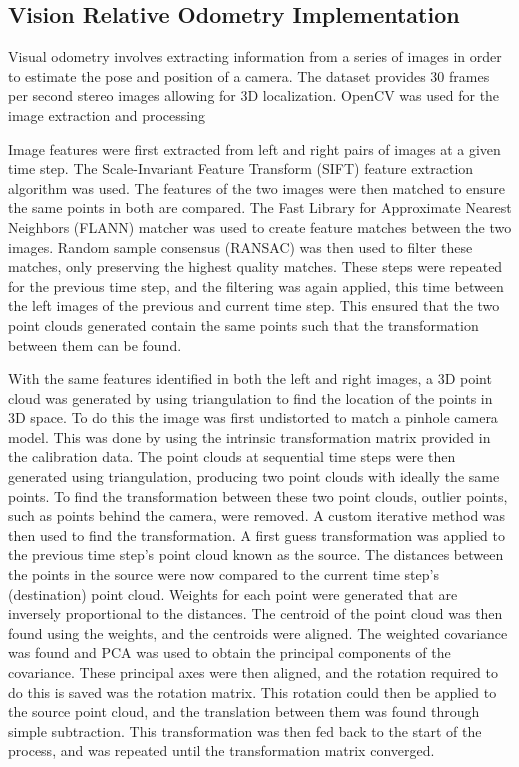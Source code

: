 \documentclass[bare_jrnl_transmag]{subfiles}
\begin{document}
\subsection{Vision Relative Odometry Implementation}

Visual odometry involves extracting information from a series of images in order to estimate the pose and position of a camera. The dataset provides 30 frames per second stereo images allowing for 3D localization. OpenCV was used for the image extraction and processing \cite{opencv} \newline 

Image features were first extracted from left and right pairs of images at a given time step. The Scale-Invariant Feature Transform (SIFT) feature extraction algorithm was used. The features of the two images were then matched to ensure the same points in both are compared. The Fast Library for Approximate Nearest Neighbors (FLANN) matcher was used to create feature matches between the two images.  Random sample consensus (RANSAC) was then used to filter these matches, only preserving the highest quality matches.  These steps were repeated for the previous time step, and the filtering was again applied, this time between the left images of the previous and current time step. This ensured that the two point clouds generated contain the same points such that the transformation between them can be found. \newline

With the same features identified in both the left and right images, a 3D point cloud was generated by using triangulation to find the location of the points in 3D space. To do this the image was first undistorted to match a pinhole camera model. This was done by using the intrinsic transformation matrix provided in the calibration data. The point clouds at sequential time steps were then generated using triangulation, producing two point clouds with ideally the same points. To find the transformation between these two point clouds, outlier points, such as points behind the camera, were removed. A custom iterative method was then used to find the transformation. A first guess transformation was applied to the previous time step's point cloud known as the source. The distances between the points in the source were now compared to the current time step's (destination) point cloud. Weights for each point were generated that are inversely proportional to the distances. The centroid of the point cloud was then found using the weights, and the centroids were aligned. The weighted covariance was found and PCA was used to obtain the principal components of the covariance. These principal axes were then aligned, and the rotation required to do this is saved was the rotation matrix. This rotation could then be applied to the source point cloud, and the translation between them was found through simple subtraction. This transformation was then fed back to the start of the process, and was repeated until the transformation matrix converged. \newline
\end{document}
